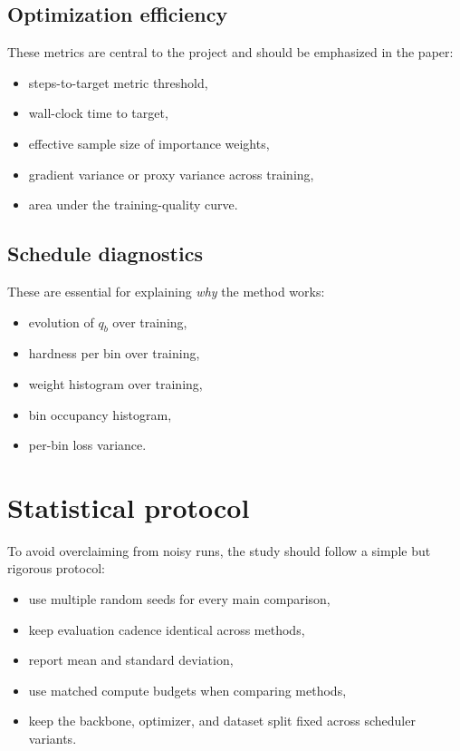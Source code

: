 \documentclass[11pt]{report}
\begin{document}
\subsection{Optimization efficiency}

These metrics are central to the project and should be emphasized in the paper:

\begin{itemize}[leftmargin=2em]
    \item steps-to-target metric threshold,
    \item wall-clock time to target,
    \item effective sample size of importance weights,
    \item gradient variance or proxy variance across training,
    \item area under the training-quality curve.
\end{itemize}

\subsection{Schedule diagnostics}

These are essential for explaining \emph{why} the method works:

\begin{itemize}[leftmargin=2em]
    \item evolution of $q_b$ over training,
    \item hardness per bin over training,
    \item weight histogram over training,
    \item bin occupancy histogram,
    \item per-bin loss variance.
\end{itemize}

\section{Statistical protocol}

To avoid overclaiming from noisy runs, the study should follow a simple but rigorous protocol:

\begin{itemize}[leftmargin=2em]
    \item use multiple random seeds for every main comparison,
    \item keep evaluation cadence identical across methods,
    \item report mean and standard deviation,
    \item use matched compute budgets when comparing methods,
    \item keep the backbone, optimizer, and dataset split fixed across scheduler variants.
\end{itemize}
\end{document}
